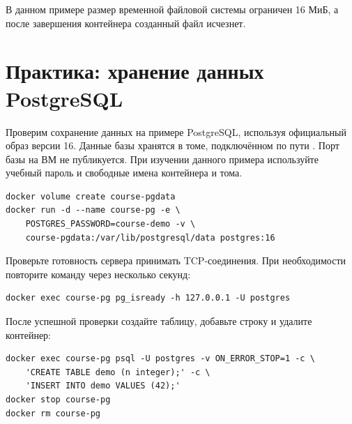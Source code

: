 В данном примере размер временной файловой системы ограничен 16 МиБ, а после завершения контейнера созданный файл  исчезнет.

\section{Практика: хранение данных PostgreSQL}

Проверим сохранение данных на примере PostgreSQL, используя официальный образ версии 16. Данные базы хранятся в томе, подключённом по пути . Порт базы на ВМ не публикуется. При изучении данного примера используйте учебный пароль и свободные имена контейнера и тома.

\par\addvspace{10pt}\noindent\begin{minipage}{\linewidth}
\begin{verbatim}
docker volume create course-pgdata
docker run -d --name course-pg -e \
    POSTGRES_PASSWORD=course-demo -v \
    course-pgdata:/var/lib/postgresql/data postgres:16
\end{verbatim}
\end{minipage}\par\addvspace{10pt}

Проверьте готовность сервера принимать TCP-соединения. При необходимости повторите команду через несколько секунд:
\par\addvspace{10pt}\noindent\begin{minipage}{\linewidth}
\begin{verbatim}
docker exec course-pg pg_isready -h 127.0.0.1 -U postgres
\end{verbatim}
\end{minipage}\par\addvspace{10pt}

\par\addvspace{10pt}\noindent\begin{minipage}{\linewidth}
\setlength{\parindent}{0pt}\noindent\hspace*{1.25cm}После успешной проверки создайте таблицу, добавьте строку и удалите контейнер:\par\kern 10pt
\begin{verbatim}
docker exec course-pg psql -U postgres -v ON_ERROR_STOP=1 -c \
    'CREATE TABLE demo (n integer);' -c \
    'INSERT INTO demo VALUES (42);'
docker stop course-pg
docker rm course-pg
\end{verbatim}
\end{minipage}\par\addvspace{10pt}


